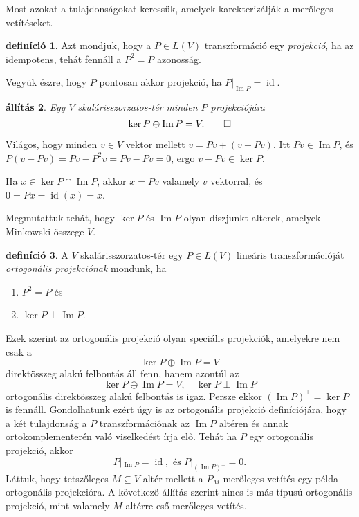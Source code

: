 \documentclass[9pt, a4paper, showtrims]{memoir}
\makeatletter
\renewenvironment{proof}[1][\proofname]
    {\par\pushQED{\qed}%
    \normalfont \topsep6\p@\@plus6\p@\relax
    \trivlist
    \item[\hskip\labelsep
        \itshape
    #1\@addpunct{:}]\ignorespaces}
    {\popQED\endtrivlist\@endpefalse}
\theoremstyle{plain}
\newtheorem{proposition}{állítás}[chapter]
\theoremstyle{remark}
\theoremstyle{definition}
\newtheorem{definition}[proposition]{definíció}
\DeclareMathOperator{\id}{id}
\DeclareMathOperator{\im}{Im}
\makeatother
\begin{document}
Most azokat a tulajdonságokat keressük, amelyek karekterizálják a merőleges vetítéseket.
\begin{definition}
	Azt mondjuk, hogy a $P\in L\left( V \right)$ transzformáció egy
	\emph{projekció},
	ha az idempotens, tehát fennáll a $P^2=P$ azonosság.
\end{definition}
Vegyük észre, hogy $P$ pontosan akkor projekció, ha $P|_{\im P}=\id.$
\begin{proposition}
	Egy $V$ skalárisszorzatos-tér minden $P$ projekciójára
	\[
		\ker P\oplus\im P=V.
		\qedhere
	\]
\end{proposition}
\begin{proof}
    Világos, hogy minden $v\in V$ vektor mellett
    $v=Pv+\left( v-Pv \right)$. 
    Itt $Pv\in\im P$, és $P\left( v-Pv \right)=Pv-P^2v=Pv-Pv=0$,
    ergo $v-Pv\in\ker P$.

    Ha $x\in\ker P\cap\im P$, akkor $x=Pv$ valamely $v$ vektorral, 
    és $0=Px=\id(x)=x$.

    Megmutattuk tehát, hogy $\ker P$ és $\im P$ olyan diszjunkt alterek, amelyek Minkowski-összege $V$.
\end{proof}
\begin{definition}
	A $V$ skalárisszorzatos-tér egy $P\in L\left( V \right)$ lineáris transzformációját
	\emph{ortogonális projekciónak}
	mondunk, ha
	\begin{enumerate}
		\item $P^2=P$ és
		\item $\ker P\perp\im P$.
		      \qedhere
	\end{enumerate}
\end{definition}
Ezek szerint az ortogonális projekció olyan speciális projekciók, amelyekre nem csak a
\[
    \ker P\oplus\im P=V
\]
direktösszeg alakú felbontás áll fenn, hanem azontúl az
\[
    \ker P\oplus\im P=V,\quad \ker P\perp\im P
\]
ortogonális direktösszeg alakú felbontás is igaz. Persze ekkor 
$\left( \im P \right)^\perp=\ker P$ is fennáll.
Gondolhatunk ezért úgy is az ortogonális projekció definíciójára, hogy a két tulajdonság a $P$ transzformációnak az $\im P$ altéren és annak ortokomplementerén való viselkedést írja elő.
Tehát ha $P$ egy ortogonális projekció, akkor
\[
    P|_{\im P}=\id,
    \text{ és }
    P|_{{\left( \im P \right)}^\perp}=0.
\]
Láttuk, hogy tetszőleges $M\subseteq V$ altér mellett a $P_M$ merőleges vetítés egy példa ortogonális projekcióra. 
A következő állítás szerint nincs is más típusú ortogonális projekció,
mint valamely $M$ altérre eső merőleges vetítés.
\end{document}
